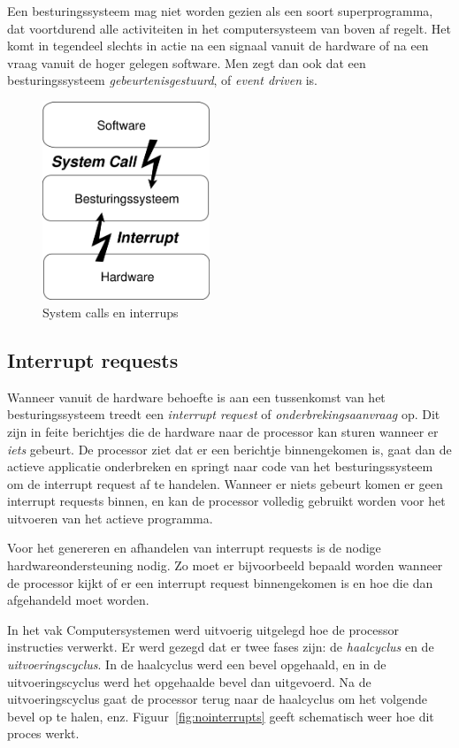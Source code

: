 Een besturingssysteem mag niet worden gezien als een soort
superprogramma, dat voortdurend alle activiteiten in het computersysteem
van boven af regelt. Het komt in tegendeel slechts in actie na een
signaal vanuit de hardware of na een vraag vanuit de hoger gelegen
software. Men zegt dan ook dat een besturingssysteem
\emph{gebeurtenisgestuurd}, of \emph{event
driven} is.

\begin{figure}
\begin{center}
\includegraphics[width=50mm]{images/fig0201.png}
\end{center}
\caption{System calls en interrups}
\label{sysint}
\end{figure}

\subsection{Interrupt requests}

Wanneer vanuit de hardware behoefte is aan een tussenkomst van
het besturingssysteem treedt een \emph{interrupt request} of
\emph{onderbrekingsaanvraag} op. Dit zijn in feite berichtjes die de hardware naar de processor kan sturen wanneer er \emph{iets} gebeurt. De processor ziet dat er een berichtje binnengekomen is, gaat dan de actieve applicatie onderbreken en springt naar code van het besturingssysteem om de interrupt request af te handelen. Wanneer er niets gebeurt komen er geen interrupt requests binnen, en kan de processor volledig gebruikt worden voor het uitvoeren van het actieve programma.

Voor het genereren en afhandelen van interrupt requests is de nodige hardwareondersteuning nodig. Zo moet er bijvoorbeeld bepaald worden wanneer de processor kijkt of er een interrupt request binnengekomen is en hoe die dan afgehandeld moet worden.

In het vak Computersystemen werd uitvoerig uitgelegd hoe de processor instructies verwerkt. Er werd gezegd dat er twee fases zijn: de \emph{haalcyclus} en de \emph{uitvoeringscyclus}. In de haalcyclus werd een bevel opgehaald, en in de uitvoeringscyclus werd het opgehaalde bevel dan uitgevoerd. Na de uitvoeringscyclus gaat de processor terug naar de haalcyclus om het volgende bevel op te halen, enz. Figuur~\ref{fig:nointerrupts} geeft schematisch weer hoe dit proces werkt.

